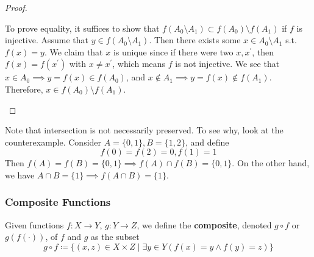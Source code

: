 \begin{proof}
\begin{enumerate}
      To prove equality, it suffices to show that $f(A_0 \setminus A_1) \subset f(A_0) \setminus f(A_1)$ if $f$ is injective. Assume that $y \in f(A_0 \setminus A_1)$. Then there exists some $x \in A_0 \setminus A_1$ s.t. $f(x) = y$. We claim that $x$ is unique since if there were two $x, x^\prime$, then $f(x) = f(x^\prime)$ with $x \neq x^\prime$, which means $f$ is not injective. We see that $x \in A_0 \implies y = f(x) \in f(A_0)$, and $x \not\in A_1 \implies y = f(x) \not\in f(A_1)$. Therefore, $x \in f(A_0) \setminus f(A_1)$. 
    \end{enumerate}
  \end{proof} 

  \begin{example}
    Note that intersection is not necessarily preserved. To see why, look at the counterexample. Consider $A = \{0, 1\}, B = \{1, 2\}$, and define 
    \begin{equation}
      f(0) = f(2) = 0, f(1) = 1
    \end{equation} 
    Then $f(A) = f(B) = \{0, 1\} \implies f(A) \cap f(B) = \{0, 1\}$. On the other hand, we have $A \cap B = \{1\} \implies f(A \cap B) = \{1\}$. 
  \end{example}

\subsubsection{Composite Functions}

  \begin{definition}[Composition]
    Given functions $f: X \rightarrow Y$, $g: Y \rightarrow Z$, we define the \textbf{composite}, denoted $g \circ f$ or $g(f(\cdot))$, of $f$ and $g$ as the subset
    \begin{equation}
      g \circ f \coloneqq \{ (x, z) \in X \times Z \mid \exists y \in Y (f(x) = y \land f(y) = z) \}
    \end{equation} 
  \end{definition}

